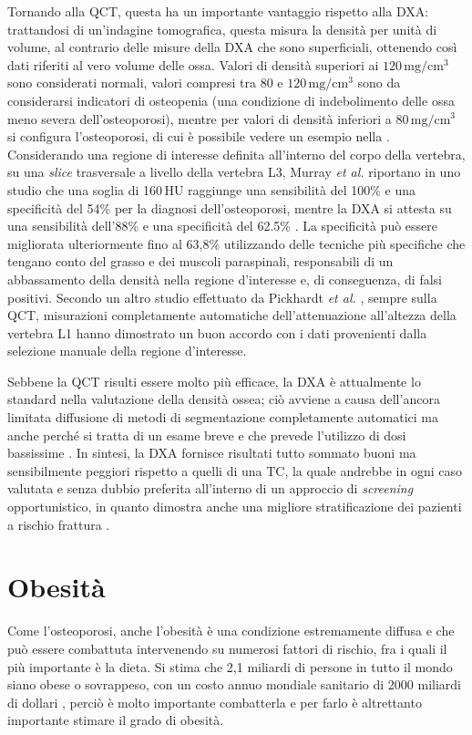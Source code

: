 Tornando alla QCT, questa ha un importante vantaggio rispetto alla DXA: trattandosi di un'indagine tomografica, questa misura la densità per unità di volume, al contrario delle misure della DXA che sono superficiali, ottenendo così dati riferiti al vero volume delle ossa. Valori di densità superiori ai $120\,\mathrm{mg}/\mathrm{cm}^3$ sono considerati normali, valori compresi tra 80 e $120\,\mathrm{mg}/\mathrm{cm}^3$ sono da considerarsi indicatori di osteopenia (una condizione di indebolimento delle ossa meno severa dell'osteoporosi), mentre per valori di densità inferiori a $80\,\mathrm{mg}/\mathrm{cm}^3$ si configura l’osteoporosi, di cui è possibile vedere un esempio nella . Considerando una regione di interesse definita all'interno del corpo della vertebra, su una \textit{slice} trasversale a livello della vertebra L3, Murray \textit{et al.} riportano in uno studio \cite{Murray2017} che una soglia di 160\,HU raggiunge una sensibilità del 100\% e una specificità del 54\% per la diagnosi dell'osteoporosi, mentre la DXA si attesta su una sensibilità dell'88\% e una specificità del 62.5\% \cite{Humadi2010, Murray2017}. La specificità può essere migliorata ulteriormente fino al 63,8\% utilizzando delle tecniche più specifiche che tengano conto del grasso e dei muscoli paraspinali, responsabili di un abbassamento della densità nella regione d’interesse e, di conseguenza, di falsi positivi. Secondo un altro studio effettuato da Pickhardt \textit{et al.} \cite{Pickhardt2021}, sempre sulla QCT, misurazioni completamente automatiche dell'attenuazione all'altezza della vertebra L1 hanno dimostrato un buon accordo con i dati provenienti dalla selezione manuale della regione d’interesse.

Sebbene la QCT risulti essere molto più efficace, la DXA è attualmente lo standard nella valutazione della densità ossea; ciò avviene a causa dell'ancora limitata diffusione di metodi di segmentazione completamente automatici ma anche perché si tratta di un esame breve e che prevede l'utilizzo di dosi bassissime \cite{siommms}. In sintesi, la DXA fornisce risultati tutto sommato buoni ma sensibilmente peggiori rispetto a quelli di una TC, la quale andrebbe in ogni caso valutata e senza dubbio preferita all'interno di un approccio di \textit{screening} opportunistico, in quanto dimostra anche una migliore stratificazione dei pazienti a rischio frattura \cite{Pickhardt2021}.

\section{Obesità}
Come l’osteoporosi, anche l’obesità è una condizione estremamente diffusa e che può essere combattuta intervenendo su numerosi fattori di rischio, fra i quali il più importante è la dieta. Si stima che 2,1 miliardi di persone in tutto il mondo siano obese o sovrappeso, con un costo annuo mondiale sanitario di 2000 miliardi di dollari \cite{deGara2015, Murray2017}, perciò è molto importante combatterla e per farlo è altrettanto importante stimare il grado di obesità.

